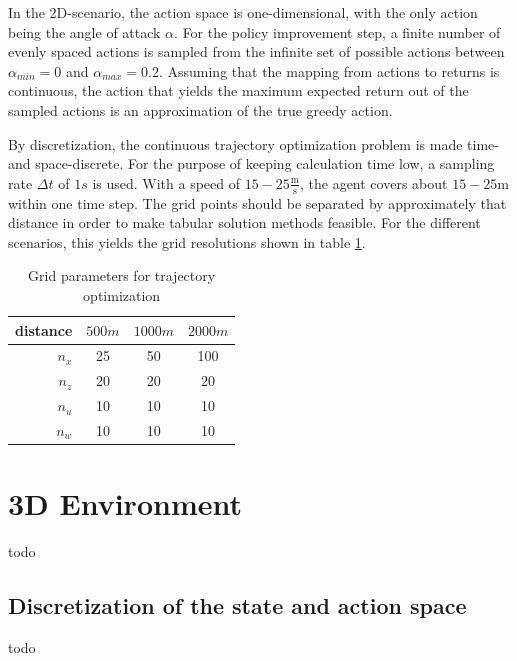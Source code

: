 In the 2D-scenario, the action space is one-dimensional, with the only action being the angle of attack $\alpha$. For the policy improvement step, a finite number of evenly spaced actions is sampled from the infinite set of possible actions between $\alpha_{min} = 0$ and $\alpha_{max}=0.2$. Assuming that the mapping from actions to returns is continuous, the action that yields the maximum expected return out of the sampled actions is an approximation of the true greedy action.

By discretization, the continuous trajectory optimization problem is made time- and space-discrete. For the purpose of keeping calculation time low, a sampling rate $\Delta t$ of $1s$ is used. With a speed of $15-25 \frac{\text{m}}{\text{s}}$, the agent covers about $15-25\text{m}$ within one time step. The grid points should be separated by approximately that distance in order to make tabular solution methods feasible. For the different scenarios, this yields the grid resolutions shown in table \ref{tab:grids}.
\begin{table}
	\begin{center}
		\begin{tabular}{r|c c c}
			distance & $500m$ & $1000m$ & $2000m$ \\ \hline
			$n_x$ & 25 & 50 & 100 \\
			$n_z$ & 20 & 20 & 20 \\
			$n_u$ & 10 & 10 & 10 \\
			$n_w$ & 10 & 10 & 10
		\end{tabular}
		\caption{Grid parameters for trajectory optimization}
		\label{tab:grids}
	\end{center}
\end{table}

\section{3D Environment}

todo

\subsection{Discretization of the state and action space}
\label{sec:disc3d}
todo